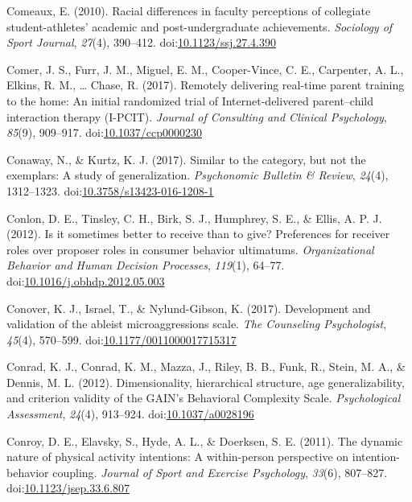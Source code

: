 \documentclass[english,man]{apa6}
\theoremstyle{definition}
\theoremstyle{definition}
\theoremstyle{definition}
\theoremstyle{remark}
\begin{document}
\hypertarget{ref-Comeaux2010}{}
Comeaux, E. (2010). Racial differences in faculty perceptions of
collegiate student-athletes' academic and post-undergraduate
achievements. \emph{Sociology of Sport Journal}, \emph{27}(4), 390--412.
doi:\href{https://doi.org/10.1123/ssj.27.4.390}{10.1123/ssj.27.4.390}

\hypertarget{ref-Comer2017a}{}
Comer, J. S., Furr, J. M., Miguel, E. M., Cooper-Vince, C. E.,
Carpenter, A. L., Elkins, R. M., \ldots{} Chase, R. (2017). Remotely
delivering real-time parent training to the home: An initial randomized
trial of Internet-delivered parent--child interaction therapy (I-PCIT).
\emph{Journal of Consulting and Clinical Psychology}, \emph{85}(9),
909--917.
doi:\href{https://doi.org/10.1037/ccp0000230}{10.1037/ccp0000230}

\hypertarget{ref-Conaway2016}{}
Conaway, N., \& Kurtz, K. J. (2017). Similar to the category, but not
the exemplars: A study of generalization. \emph{Psychonomic Bulletin \&
Review}, \emph{24}(4), 1312--1323.
doi:\href{https://doi.org/10.3758/s13423-016-1208-1}{10.3758/s13423-016-1208-1}

\hypertarget{ref-Conlon2012}{}
Conlon, D. E., Tinsley, C. H., Birk, S. J., Humphrey, S. E., \& Ellis,
A. P. J. (2012). Is it sometimes better to receive than to give?
Preferences for receiver roles over proposer roles in consumer behavior
ultimatums. \emph{Organizational Behavior and Human Decision Processes},
\emph{119}(1), 64--77.
doi:\href{https://doi.org/10.1016/j.obhdp.2012.05.003}{10.1016/j.obhdp.2012.05.003}

\hypertarget{ref-Conover2017}{}
Conover, K. J., Israel, T., \& Nylund-Gibson, K. (2017). Development and
validation of the ableist microaggressions scale. \emph{The Counseling
Psychologist}, \emph{45}(4), 570--599.
doi:\href{https://doi.org/10.1177/0011000017715317}{10.1177/0011000017715317}

\hypertarget{ref-Conrad2012}{}
Conrad, K. J., Conrad, K. M., Mazza, J., Riley, B. B., Funk, R., Stein,
M. A., \& Dennis, M. L. (2012). Dimensionality, hierarchical structure,
age generalizability, and criterion validity of the GAIN's Behavioral
Complexity Scale. \emph{Psychological Assessment}, \emph{24}(4),
913--924. doi:\href{https://doi.org/10.1037/a0028196}{10.1037/a0028196}

\hypertarget{ref-Conroy2011}{}
Conroy, D. E., Elavsky, S., Hyde, A. L., \& Doerksen, S. E. (2011). The
dynamic nature of physical activity intentions: A within-person
perspective on intention-behavior coupling. \emph{Journal of Sport and
Exercise Psychology}, \emph{33}(6), 807--827.
doi:\href{https://doi.org/10.1123/jsep.33.6.807}{10.1123/jsep.33.6.807}
\end{document}
